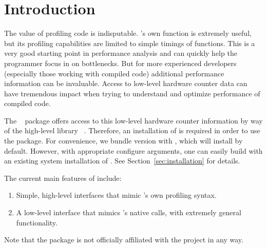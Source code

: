 \section{Introduction}
\label{sec:introduction}

The value of profiling code is indisputable.  \R's own  function 
is extremely useful, but its profiling capabilities are limited to simple 
timings of \R functions. This is a very good starting point in performance 
analysis and can quickly help the \R programmer focus in on bottlenecks.  But 
for more experienced developers (especially those working with compiled code) 
additional performance information can be invaluable. Access to low-level 
hardware counter data can have tremendous impact when trying to understand and 
optimize performance of compiled code. 

The \thispackage~\citep{Schmidt2014pbdPAPIpackage} package offers access to  
this low-level hardware counter information by way of the high-level \C library 
\PAPI~\citep{mucci1999papi}.  Therefore, an installation of \PAPI is required in 
order to use the package.  For convenience, we bundle \PAPI version \PAPIversion 
with \thispackage, which will install by default.  However, with appropriate 
configure arguments, one can easily build \thispackage with an existing system 
installation of \PAPI.  See Section~\ref{sec:installation} for details.

The current main features of \thispackage include:
\begin{enumerate}
  \item Simple, high-level interfaces that mimic \R's own profiling syntax.
  \item A low-level interface that mimics \PAPI's native calls, with  extremely 
  general functionality.
\end{enumerate}

Note that the  package is not officially affiliated with the 
 project in any way.